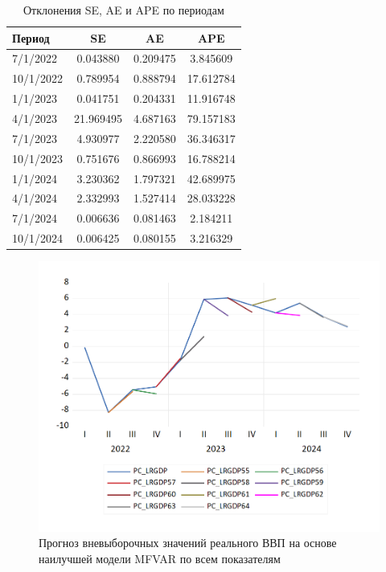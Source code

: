 \documentclass[a4paper, 14pt]{extreport}
\numberwithin{equation}{section}
\numberwithin{equation}{section}
\begin{document}
	\begin{table}[h!]
		\centering
		\caption{Отклонения SE, AE и APE по периодам}
		\begin{tabular}{lccc}
			\toprule
			\textbf{Период} & \textbf{SE} & \textbf{AE} & \textbf{APE} \\ 
			\midrule
			7/1/2022  & 0.043880      & 0.209475     & 3.845609      \\ 
			10/1/2022 & 0.789954      & 0.888794     & 17.612784     \\ 
			1/1/2023  & 0.041751      & 0.204331     & 11.916748     \\ 
			4/1/2023  & 21.969495     & 4.687163     & 79.157183     \\ 
			7/1/2023  & 4.930977      & 2.220580     & 36.346317     \\ 
			10/1/2023 & 0.751676      & 0.866993     & 16.788214     \\ 
			1/1/2024  & 3.230362      & 1.797321     & 42.689975     \\ 
			4/1/2024  & 2.332993      & 1.527414     & 28.033228     \\ 
			7/1/2024  & 0.006636      & 0.081463     & 2.184211      \\ 
			10/1/2024 & 0.006425      & 0.080155     & 3.216329      \\ 
			\bottomrule
		\end{tabular}
		\label{tab:metrics-2}
	\end{table}
	
	\begin{figure}[h!]
		\centering
		\includegraphics[scale=0.7]{images/image47}
		\caption{Прогноз вневыборочных значений реального ВВП на основе наилучшей модели MFVAR по всем показателям}
		\label{fig:image47}
	\end{figure}
	
\end{document}
